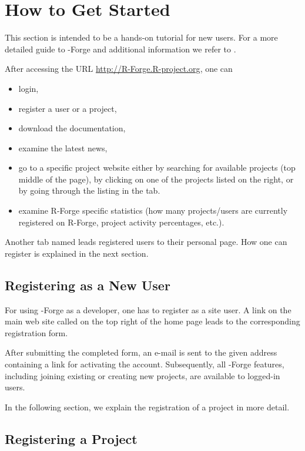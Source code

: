\section{How to Get Started}
This section is intended to be a hands-on tutorial for new users. For
a more detailed guide to \R{}-Forge and additional 
information we refer to \citet[][subsequently
referred to as the user's manual]{forge:usermanual:2008}.

After accessing the URL \url{http://R-Forge.R-project.org}, one can
\begin{itemize}
\item login,
\item register a user or a project,
\item download the documentation,
\item examine the latest news,
\item go to a specific project website either by searching for available
  projects (top middle of the page), by clicking on one of the projects
  listed on the right, or by going through the listing in
  the  tab. 
\item examine R-Forge specific statistics (how many projects/users
  are currently registered on R-Forge, project activity percentages,
  etc.).
\end{itemize}

Another tab named  leads registered users
to their personal page. How one can register is explained in
the next section.

\subsection{Registering as a New User}

For using \R{}-Forge as a developer, one has
to register as a site user. A link on the main web site called
 on the top right of the home page leads to the
corresponding registration form.

After submitting the completed form, an e-mail is sent to the given
address containing a link for activating the account. Subsequently,
all \R{}-Forge features, including joining existing or creating
new projects, are available to logged-in users.

In the following section, we explain the registration of a project in
more detail.  

\subsection{Registering a Project}

